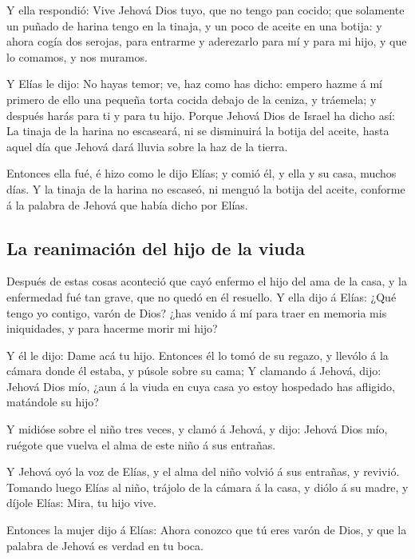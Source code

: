  Y ella respondió: Vive Jehová Dios tuyo, que no tengo
pan cocido; que solamente un puñado de harina tengo en la tinaja, y un
poco de aceite en una botija: y ahora cogía dos serojas, para entrarme y
aderezarlo para mí y para mi hijo, y que lo comamos, y nos muramos.

 Y Elías le dijo: No hayas temor; ve, haz como has dicho:
empero hazme á mí primero de ello una pequeña torta cocida debajo de la
ceniza, y tráemela; y después harás para ti y para tu hijo.
 Porque Jehová Dios de Israel ha dicho así: La tinaja de
la harina no escaseará, ni se disminuirá la botija del aceite, hasta
aquel día que Jehová dará lluvia sobre la haz de la tierra.

 Entonces ella fué, é hizo como le dijo Elías; y comió
él, y ella y su casa, muchos días.  Y la tinaja de la
harina no escaseó, ni menguó la botija del aceite, conforme á la palabra
de Jehová que había dicho por Elías.

\hypertarget{la-reanimaciuxf3n-del-hijo-de-la-viuda}{%
\subsection{La reanimación del hijo de la
viuda}\label{la-reanimaciuxf3n-del-hijo-de-la-viuda}}

 Después de estas cosas aconteció que cayó enfermo el
hijo del ama de la casa, y la enfermedad fué tan grave, que no quedó en
él resuello.  Y ella dijo á Elías: ¿Qué tengo yo contigo,
varón de Dios? ¿has venido á mí para traer en memoria mis iniquidades, y
para hacerme morir mi hijo?

 Y él le dijo: Dame acá tu hijo. Entonces él lo tomó de
su regazo, y llevólo á la cámara donde él estaba, y púsole sobre su
cama;  Y clamando á Jehová, dijo: Jehová Dios mío, ¿aun á
la viuda en cuya casa yo estoy hospedado has afligido, matándole su
hijo?

 Y midióse sobre el niño tres veces, y clamó á Jehová, y
dijo: Jehová Dios mío, ruégote que vuelva el alma de este niño á sus
entrañas.

 Y Jehová oyó la voz de Elías, y el alma del niño volvió
á sus entrañas, y revivió.  Tomando luego Elías al niño,
trájolo de la cámara á la casa, y diólo á su madre, y díjole Elías:
Mira, tu hijo vive.

 Entonces la mujer dijo á Elías: Ahora conozco que tú
eres varón de Dios, y que la palabra de Jehová es verdad en tu boca.

